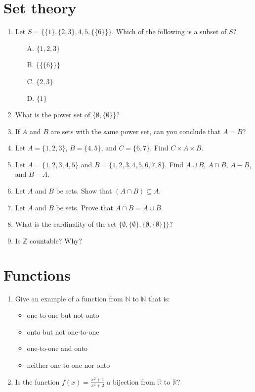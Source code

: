\documentclass{article}
\begin{document}
    \section{Set theory}
        \begin{enumerate}
            \item Let $S = \{\{1\}, \{2, 3\}, 4, 5, \{\{6\}\}\}.$ Which of the following is a subset of $S$?
                \begin{itemize}
                    \item[A.] $\{1, 2, 3\}$
                    \item[B.] $\{\{\{6\}\}\}$
                    \item[C.] $\{2, 3\}$
                    \item[D.] $\{1\}$
                \end{itemize}
            \item What is the power set of $\{\emptyset, \{\emptyset\}\}$?
            \item If $A$ and $B$ are sets with the same power set, can you conclude that $A = B$?
            \item Let $A = \{1, 2, 3\}$, $B = \{4, 5\}$, and $C = \{6, 7\}$. Find $C \times A \times B.$
            \item Let $A = \{1, 2, 3, 4, 5\}$ and $B = \{1, 2, 3, 4, 5, 6, 7, 8\}$. Find $A \cup B$, $A \cap B$, $A - B$, and $B - A.$
            \item Let $A$ and $B$ be sets. Show that $(A \cap B) \subseteq A$. 
            \item Let $A$ and $B$ be sets. Prove that $\overline{A \cap B} = \overline{A} \cup \overline{B}$.
            \item What is the cardinality of the set $\{\emptyset, \{\emptyset\}, \{\emptyset, \{\emptyset\}\}\}$?
            \item Is $\mathbb{Z}$ countable? Why?
        \end{enumerate}
    \section{Functions}
        \begin{enumerate}
            \item Give an example of a function from $\mathbb{N}$ to $\mathbb{N}$ that is:
                \begin{itemize}
                    \item one-to-one but not onto
                    \item onto but not one-to-one
                    \item one-to-one and onto
                    \item neither one-to-one nor onto
                \end{itemize}
            \item Is the function $f(x) = \frac{x^2 + 1}{x^2 + 2}$ a bijection from $\mathbb{R}$ to $\mathbb{R}$?
        \end{enumerate}
\end{document}
